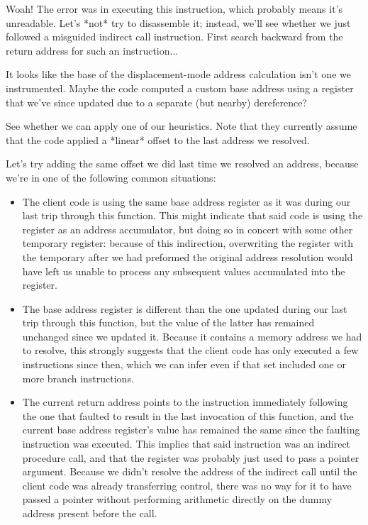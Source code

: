 \documentclass[12pt,letterpaper]{book}
\begin{document}
Woah!  The error was in executing this instruction, which probably means it's
unreadable.  Let's *not* try to disassemble it; instead, we'll see whether we
just followed a misguided indirect call instruction.  First search backward from
the return address for such an instruction...

It looks like the base of the displacement-mode address calculation isn't one we
instrumented.  Maybe the code computed a custom base address using a register
that we've since updated due to a separate (but nearby) dereference?

See whether we can apply one of our heuristics.  Note that they currently assume
that the code applied a *linear* offset to the last address we resolved.

Let's try adding the same offset we did last time we resolved an address,
because we're in one of the following common situations:
\begin{itemize}
\item The client code is using the same base address register as it was
	during our last trip through this function.  This might indicate that
	said code is using the register as an address accumulator, but doing
	so in concert with some other temporary register: because of this
	indirection, overwriting the register with the temporary after we
	had preformed the original address resolution would have left us
	unable to process any subsequent values accumulated into the register.
\item The base address register is different than the one updated during our
	last trip through this function, but the value of the latter has
	remained unchanged since we updated it.  Because it contains a memory
	address we had to resolve, this strongly suggests that the client code
	has only executed a few instructions since then, which we can infer
	even if that set included one or more branch instructions.
\item The current return address points to the instruction immediately
	following the one that faulted to result in the last invocation of
	this function, and the current base address register's value has
	remained the same since the faulting instruction was executed.  This
	implies that said instruction was an indirect procedure call, and that
	the register was probably just used to pass a pointer argument.
	Because we didn't resolve the address of the indirect call until the
	client code was already transferring control, there was no way for it
	to have passed a pointer without performing arithmetic directly on the
	dummy address present before the call.
\end{itemize}
\end{document}
